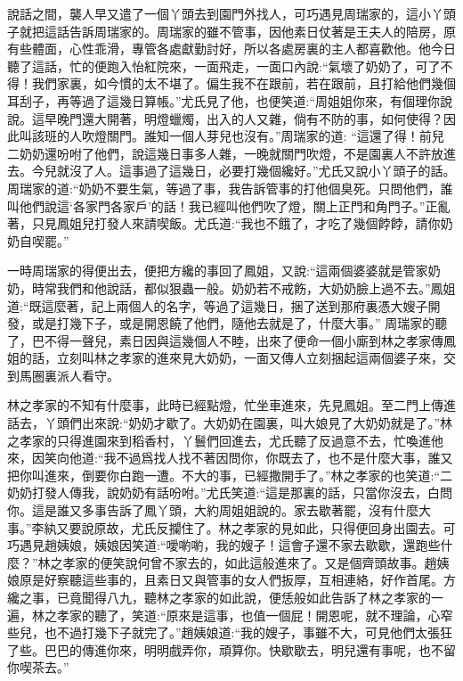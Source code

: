 \begin{parag}
    說話之間，襲人早又遣了一個丫頭去到園門外找人，可巧遇見周瑞家的，這小丫頭子就把這話告訴周瑞家的。周瑞家的雖不管事，因他素日仗著是王夫人的陪房，原有些體面，心性乖滑，專管各處獻勤討好，所以各處房裏的主人都喜歡他。他今日聽了這話，忙的便跑入怡紅院來，一面飛走，一面口內說:“氣壞了奶奶了，可了不得！我們家裏，如今慣的太不堪了。偏生我不在跟前，若在跟前，且打給他們幾個耳刮子，再等過了這幾日算帳。”尤氏見了他，也便笑道:“周姐姐你來，有個理你說說。這早晚門還大開著，明燈蠟燭，出入的人又雜，倘有不防的事，如何使得？因此叫該班的人吹燈關門。誰知一個人芽兒也沒有。”周瑞家的道: “這還了得！前兒二奶奶還吩咐了他們，說這幾日事多人雜，一晚就關門吹燈，不是園裏人不許放進去。今兒就沒了人。這事過了這幾日，必要打幾個纔好。”尤氏又說小丫頭子的話。周瑞家的道:“奶奶不要生氣，等過了事，我告訴管事的打他個臭死。只問他們，誰叫他們說這‘各家門各家戶’的話！我已經叫他們吹了燈，關上正門和角門子。”正亂著，只見鳳姐兒打發人來請喫飯。尤氏道:“我也不餓了，才吃了幾個餑餑，請你奶奶自喫罷。”
\end{parag}


\begin{parag}
    一時周瑞家的得便出去，便把方纔的事回了鳳姐，又說:“這兩個婆婆就是管家奶奶，時常我們和他說話，都似狠蟲一般。奶奶若不戒飭，大奶奶臉上過不去。”鳳姐道:“既這麼著，記上兩個人的名字，等過了這幾日，捆了送到那府裏憑大嫂子開發，或是打幾下子，或是開恩饒了他們，隨他去就是了，什麼大事。” 周瑞家的聽了，巴不得一聲兒，素日因與這幾個人不睦，出來了便命一個小廝到林之孝家傳鳳姐的話，立刻叫林之孝家的進來見大奶奶，一面又傳人立刻捆起這兩個婆子來，交到馬圈裏派人看守。
\end{parag}


\begin{parag}
    林之孝家的不知有什麼事，此時已經點燈，忙坐車進來，先見鳳姐。至二門上傳進話去，丫頭們出來說:“奶奶才歇了。大奶奶在園裏，叫大娘見了大奶奶就是了。”林之孝家的只得進園來到稻香村，丫鬟們回進去，尤氏聽了反過意不去，忙喚進他來，因笑向他道:“我不過爲找人找不著因問你，你既去了，也不是什麼大事，誰又把你叫進來，倒要你白跑一遭。不大的事，已經撒開手了。”林之孝家的也笑道:“二奶奶打發人傳我，說奶奶有話吩咐。”尤氏笑道:“這是那裏的話，只當你沒去，白問你。這是誰又多事告訴了鳳丫頭，大約周姐姐說的。家去歇著罷，沒有什麼大事。”李紈又要說原故，尤氏反攔住了。林之孝家的見如此，只得便回身出園去。可巧遇見趙姨娘，姨娘因笑道:“噯喲喲，我的嫂子！這會子還不家去歇歇，還跑些什麼？”林之孝家的便笑說何曾不家去的，如此這般進來了。又是個齊頭故事。趙姨娘原是好察聽這些事的，且素日又與管事的女人們扳厚，互相連絡，好作首尾。方纔之事，已竟聞得八九，聽林之孝家的如此說，便恁般如此告訴了林之孝家的一遍，林之孝家的聽了，笑道:“原來是這事，也值一個屁！開恩呢，就不理論，心窄些兒，也不過打幾下子就完了。”趙姨娘道:“我的嫂子，事雖不大，可見他們太張狂了些。巴巴的傳進你來，明明戲弄你，頑算你。快歇歇去，明兒還有事呢，也不留你喫茶去。”
\end{parag}


